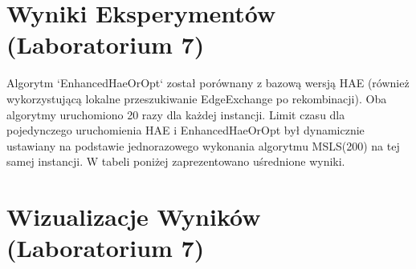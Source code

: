 \documentclass[12pt,a4paper]{article}
\begin{document}
\section{Wyniki Eksperymentów (Laboratorium 7)}
\label{sec:lab7_results}
Algorytm `EnhancedHaeOrOpt` został porównany z bazową wersją HAE (również wykorzystującą lokalne przeszukiwanie EdgeExchange po rekombinacji). Oba algorytmy uruchomiono 20 razy dla każdej instancji. Limit czasu dla pojedynczego uruchomienia HAE i EnhancedHaeOrOpt był dynamicznie ustawiany na podstawie jednorazowego wykonania algorytmu MSLS(200) na tej samej instancji. W tabeli poniżej zaprezentowano uśrednione wyniki.

\begin{table}[H]
\centering
\caption{Porównanie wyników EnhancedHaeOrOpt z HAE Baseline (średnie z 20 uruchomień)}
\label{tab:lab7_results}
\end{table}

\section{Wizualizacje Wyników (Laboratorium 7)}
\label{sec:lab7_visualizations}
\end{document}
